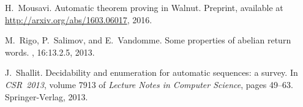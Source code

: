 \documentclass[11pt,reqno]{amsart}
\numberwithin{equation}{section}
\theoremstyle{plain}
\theoremstyle{definition}
\theoremstyle{remark}
\begin{document}
\begin{thebibliography}{10}
H.~Mousavi.
\newblock Automatic theorem proving in {Walnut}.
\newblock Preprint, available at \url{http://arxiv.org/abs/1603.06017}, 2016.

M.~Rigo, P.~Salimov, and E.~Vandomme.
\newblock Some properties of abelian return words.
, 16:13.2.5, 2013.

J.~Shallit.
\newblock Decidability and enumeration for automatic sequences: a survey.
\newblock In {\em CSR~2013}, volume 7913 of {\em Lecture Notes in Computer
  Science}, pages 49--63. Springer-Verlag, 2013.

\end{thebibliography}
\end{document}
